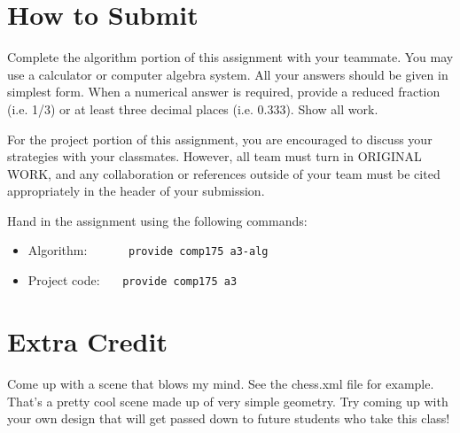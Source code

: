 \documentclass[10pt,twocolumn]{article}
\begin{document}
\section{How to Submit}					
Complete the algorithm portion of this assignment with your teammate. You may use a calculator or computer algebra system. All your answers should be given in simplest form. When a numerical answer is required, provide a reduced fraction (i.e. 1/3) or at least three decimal places (i.e. 0.333).  Show all work.

For the project portion of this assignment, you are encouraged to discuss your strategies with your classmates. However, all team must turn in ORIGINAL WORK, and any collaboration or references outside of your team must be cited appropriately in the header of your submission.

Hand in the assignment using the following commands:
\begin{itemize}
\item Algorithm:  \ \ \ \ \ \ {\tt provide comp175 a3-alg}
\item Project code: \ \ \ {\tt provide comp175 a3}
\end{itemize}

\section{Extra Credit}
Come up with a scene that blows my mind. See the chess.xml file for example. That's a pretty cool scene made up of very simple geometry. Try coming up with your own design that will get passed down to future students who take this class! 
\end{document}
